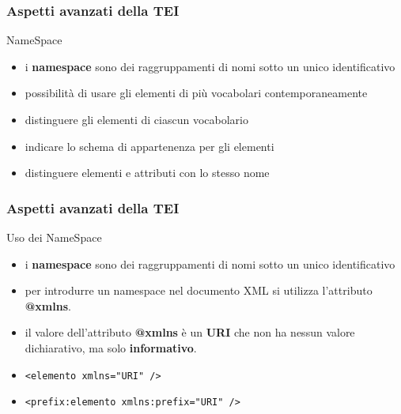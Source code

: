     \begin{frame}
        \frametitle{Aspetti avanzati della TEI}
        \addtocounter{nframe}{1}

        \begin{block}{NameSpace}
            \begin{itemize}
                \item i \textbf{namespace} sono dei raggruppamenti di nomi sotto un unico identificativo
                \item possibilità di usare gli elementi di più vocabolari contemporaneamente
                \item distinguere gli elementi di ciascun vocabolario
                \item indicare lo schema di appartenenza per gli elementi
                \item distinguere elementi e attributi con lo stesso nome
            \end{itemize}
        \end{block}
    \end{frame}


    \begin{frame}
        \frametitle{Aspetti avanzati della TEI}
        \addtocounter{nframe}{1}

        \begin{block}{Uso dei NameSpace}
            \begin{itemize}
                \item i \textbf{namespace} sono dei raggruppamenti di nomi sotto un unico identificativo
                \item per introdurre un namespace nel documento XML si utilizza l'attributo \textbf{@xmlns}.
                \item il valore dell'attributo \textbf{@xmlns} è un \textbf{URI} che non ha nessun valore dichiarativo, ma solo \textbf{informativo}.
                \item \texttt{<elemento xmlns="URI" />}
                \item \texttt{<prefix:elemento xmlns:prefix="URI" />}
            \end{itemize}
        \end{block}
    \end{frame}

